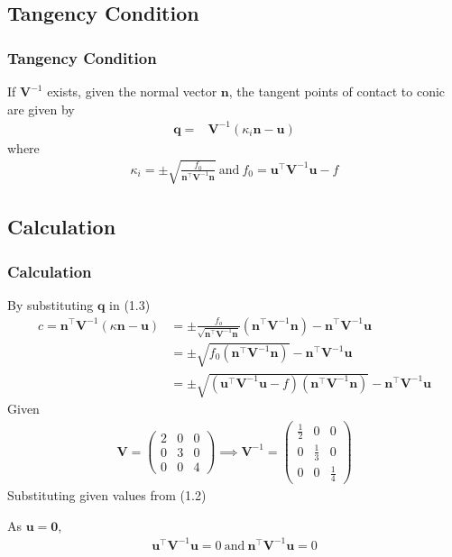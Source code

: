 \documentclass{beamer}
\providecommand{\brak}[1]{\ensuremath{\left(#1\right)}}
\theoremstyle{remark}
\newcommand{\myvec}[1]{\ensuremath{\begin{pmatrix}#1\end{pmatrix}}}
\let\vec\mathbf
\numberwithin{equation}{section}
\begin{document}
\subsection{Tangency Condition}
\begin{frame}
\frametitle{Tangency Condition}
 If $\vec{V}^{-1}$ exists, given the normal vector $\vec{n}$, the tangent points of contact to conic are given by
\begin{align}
     \vec{q} = &\vec{V}^{-1}(\kappa_{i} \vec{n} - \vec{u}) 
\end{align}
where 
\begin{align}
    \kappa_{i} = 
    \pm\sqrt{\frac{f_0}{\vec{n}^\top\vec{V}^{-1}\vec{n}}}\ \text{and}\ f_0 = \vec{u}^\top\vec{V}^{-1}\vec{u} - f
\end{align}
\end{frame}
\subsection{Calculation}
\begin{frame}
\frametitle{Calculation}
By substituting $\vec{q}$ in (1.3)
\begin{align}
 c = \vec{n}^\top \vec{V}^{-1}(\kappa \vec{n} - \vec{u}) &= \pm \frac{f_o}{\sqrt{\vec{n}^\top\vec{V}^{-1}\vec{n}}}\brak{\vec{n}^\top\vec{V}^{-1}\vec{n}} - \vec{n}^\top\vec{V}^{-1}\vec{u}\\
 &=\pm\sqrt{f_0 (\vec{n}^\top\vec{V}^{-1}\vec{n})} - \vec{n}^\top\vec{V}^{-1}\vec{u} \\
 &=\pm\sqrt{\brak{\vec{u}^\top\vec{V}^{-1}\vec{u} - f}(\vec{n}^\top\vec{V}^{-1}\vec{n})} - \vec{n}^\top\vec{V}^{-1}\vec{u}
 \end{align}
 Given 
 \begin{align}
     \vec{V} =  \myvec{ 2 & 0 & 0 \\ 0 & 3 & 0 \\ 0 & 0 & 4 } \implies 
     \vec{V}^{-1} =  \myvec{ \frac{1}{2} & 0 & 0 \\ 0 & \frac{1}{3} & 0 \\ 0 & 0 & \frac{1}{4} }
 \end{align}
 Substituting given values from (1.2) 

 As $\vec{u}=\vec{0}$,
 \begin{align}
     \vec{u}^\top\vec{V}^{-1}\vec{u} = 0\ \text{and}\  \vec{n}^\top\vec{V}^{-1}\vec{u} = 0
     \end{align}
\end{frame}
\end{document}
